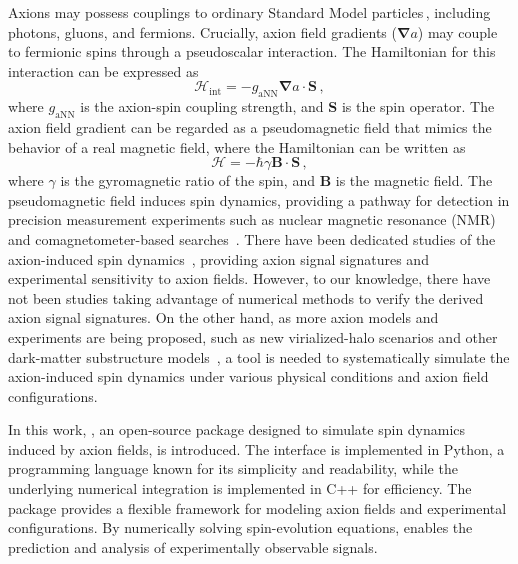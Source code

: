 \documentclass[universe,article,submit,oneauthor]{Definitions/mdpi}
\begin{document}
Axions may possess couplings to ordinary Standard Model particles\,\cite{Graham2013_Newobservables}, including photons, gluons, and fermions. 
Crucially, axion field gradients ($\mathbf{\nabla}a$) may couple to fermionic spins through a pseudoscalar interaction. The Hamiltonian for this interaction can be expressed as
\begin{equation}
    \mathcal{H}_{\mathrm{int}} = - g_\mathrm{aNN} \mathbf{\nabla}a \cdot \mathbf{S}\,,
\end{equation}
where $g_\mathrm{aNN}$ is the axion-spin coupling strength, and $\mathbf{S}$ is the spin operator. 
The axion field gradient can be regarded as a pseudomagnetic field that mimics the behavior of a real magnetic field, where the Hamiltonian can be written as
\begin{equation}
    \mathcal{H} = -\hbar \gamma \mathbf{B} \cdot \mathbf{S} \,,
\end{equation} 
where $\gamma$ is the gyromagnetic ratio of the spin, and $\mathbf{B}$ is the magnetic field. 
The pseudomagnetic field induces spin dynamics, providing a pathway for detection in precision measurement experiments such as nuclear magnetic resonance (NMR) and comagnetometer-based searches~\cite{Gramolin2021_Ferromagnetic,CASPErProposal2014,kimball2018overview,Walter2025_CASPErG}. There have been dedicated studies of the axion-induced spin dynamics~\cite{Aybas_2021_Quantum_sensitivity,Yuzhe2023_FrequencyScanning}, providing axion signal signatures and experimental sensitivity to axion fields. 
However, to our knowledge, there have not been studies taking advantage of numerical methods to verify the derived axion signal signatures. 
On the other hand, as more axion models and experiments are being proposed, such as new virialized-halo scenarios and other dark-matter substructure models~\cite{Evans2019_SHMRefined,Gramolin2022Feb_SpectralSignatures}, a tool is needed to systematically simulate the axion-induced spin dynamics under various physical conditions and axion field configurations.

In this work, \axionbloch{}, an open-source package designed to simulate spin dynamics induced by axion fields, is introduced. 
The interface is implemented in Python, a programming language known for its simplicity and readability, while the underlying numerical integration is implemented in C++ for efficiency. 
The package provides a flexible framework for modeling axion fields and experimental configurations. 
By numerically solving spin-evolution equations, \axionbloch{} enables the prediction and analysis of experimentally observable signals.
\end{document}
